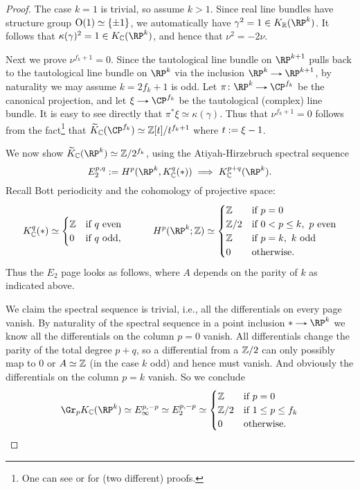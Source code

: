\begin{proof}
  The case $k=1$ is trivial, so assume $k > 1$. Since real line
  bundles have structure group $\mathrm{O}(1) \simeq \{\pm 1\}$, we
  automatically have $\gamma^2 = 1 \in K_\R(\RP^k)$. It follows that
  $\kappa(\gamma)^2 = 1 \in K_\C(\RP^k)$, and hence that $\nu^2 =
  -2\nu$.

  Next we prove $\nu^{f_k+1} = 0$. Since the tautological line bundle on
  $\RP^{k+1}$ pulls back to the tautological line bundle on $\RP^k$
  via the inclusion $\RP^k \to \RP^{k+1}$, by naturality we may assume
  $k = 2f_k+1$ is odd. Let $\pi \c \RP^k \to \CP^{f_k}$ be the canonical
  projection, and let $\xi \to \CP^{f_k}$ be the tautological (complex)
  line bundle. It is easy to see directly that $\pi^*\xi \simeq
  \kappa(\gamma)$. Thus that $\nu^{f_k+1} = 0$ follows from the
  fact\footnote{One can see \cite{atiyah-kthy} or \cite{adams-vfields}
    for (two different) proofs.}  that $\til K_\C(\CP^{f_k}) \simeq
  \Z[t]/t^{f_k+1}$ where $t \mathrel{:=} \xi - 1$.

  We now show $\til K_\C(\RP^k) \simeq \Z/2^{f_k}$, using the
  Atiyah-Hirzebruch spectral sequence
  \[
  E_2^{p,q} \ce H^p(\RP^k,K_\C^q(*)) \implies K_\C^{p+q}(\RP^k).
  \]
  Recall Bott periodicity and the cohomology of projective space:
  \[
  K_\C^q(*) \simeq
  \begin{cases}
    \Z & \text{if }q\text{ even} \\
    0 & \text{if }q\text{ odd},
  \end{cases}
  \hspace{30pt}
  H^p(\RP^k;\Z) \simeq
  \begin{cases}
    \Z & \text{if }p=0 \\
    \Z/2 & \text{if }0 < p \le k,\ p\text{ even} \\
    \Z & \text{if }p=k,\ k\text{ odd} \\
    0 & \text{otherwise}.
  \end{cases}
  \]  
  Thus the $E_2$ page looks as follows, where $A$ depends on the parity
  of $k$ as indicated above.

  

  We claim the spectral sequence is trivial, i.e., all the
  differentials on every page vanish. By naturality of the spectral
  sequence in a point inclusion $* \to \RP^k$ we know all the
  differentials on the column $p=0$ vanish. All differentials change
  the parity of the total degree $p+q$, so a differential from a
  $\mathbb{Z}/2$ can only possibly map to $0$ or $A \simeq\mathbb{Z}$ (in the case $k$
  odd) and hence must vanish. And obviously the differentials on the
  column $p=k$ vanish. So we conclude
  \[
  \Gr_pK_\C(\RP^k) \simeq E_\infty^{p,-p} \simeq E_2^{p,-p} \simeq
  \begin{cases}
    \Z & \text{if }p = 0\\
    \Z/2 & \text{if }1 \le p \le f_k\\
    0 & \text{otherwise}.
  \end{cases}
  \]


\end{proof}
